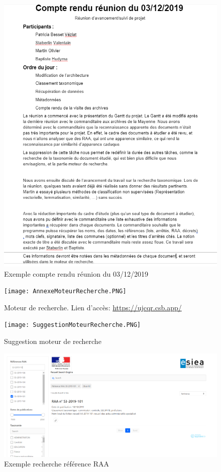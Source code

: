 \begin{figure}[h!]
  \includegraphics[width=\linewidth]{images/ExempleCR.PNG}
	\caption{Exemple compte rendu réunion du 03/12/2019}
	\label{}
\end{figure}

\begin{figure}[h!]
  \texttt{[image: AnnexeMoteurRecherche.PNG]}
	\caption{Moteur de recherche. Lien d'accès: \href{https://ujcqr.csb.app/}{https://ujcqr.csb.app/}}
	\label{}
\end{figure}

\begin{figure}[h!]
  \texttt{[image: SuggestionMoteurRecherche.PNG]}
	\caption{Suggestion moteur de recherche}
	\label{}
\end{figure}

\begin{figure}[h!]
  \includegraphics[width=\linewidth]{images/rechercheReferenceMoteurRecherche.PNG}
	\caption{Exemple recherche référence RAA}
	\label{}
\end{figure}

